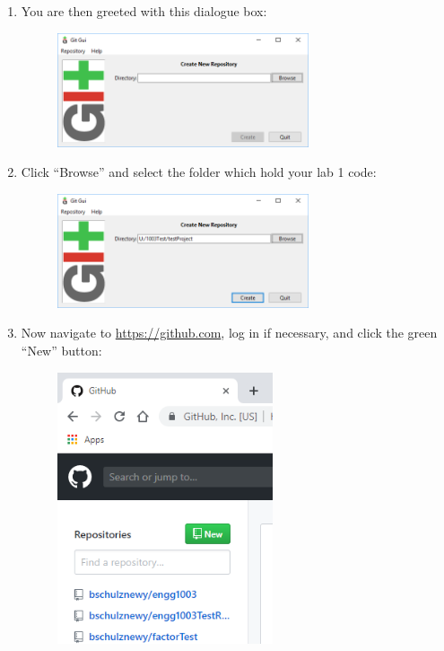 \documentclass{lab}
\begin{document}
\begin{task}{}{}
\begin{enumerate}
\item You are then greeted with this dialogue box:

\begin{figure}[H]
\begin{center}
\includegraphics[width=0.7\textwidth]{Wk1Images/git3}
\end{center}
\end{figure}

\item Click ``Browse'' and select the folder which hold your lab 1 code:

\begin{figure}[H]
\begin{center}
\includegraphics[width=0.7\textwidth]{Wk1Images/git4}
\end{center}
\end{figure}

\pagebreak

\item Now navigate to \url{https://github.com}, log in if necessary, and click the green ``New'' button:

\begin{figure}[H]
\begin{center}
\includegraphics[width=0.6\textwidth]{Wk1Images/git5a}
\end{center}
\end{figure}


\end{enumerate}
\end{task}
\end{document}

